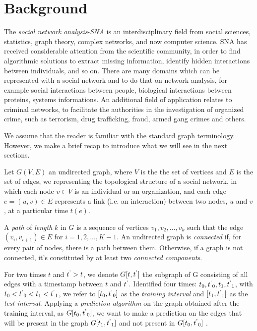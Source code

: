 \section{Background}
\label{sec:background}
The \textit{social network analysis}-\textit{SNA} is an interdisciplinary field from social sciences, statistics, graph theory, complex networks, and now computer science. SNA has received considerable attention from the scientific community, in order to find algorithmic solutions to extract missing information, identify hidden interactions between individuals, and so on. 
There are many domains which can be represented with a social network and to do that on network analysis, for example social interactions between people, biological interactions between proteins, systems informations. An additional field of application relates to criminal networks, to facilitate the authorities in the investigation of organized crime, such as terrorism, drug trafficking, fraud, armed gang crimes and others\cite{xu2005criminal}.


We assume that the reader is familiar with the standard graph terminology. However, we make a brief recap to introduce what we will see in the next sections.

Let $G(V,E)$ an undirected graph, where $V$ is the the set of vertices and $E$ is the set of edges, we representing the topological structure of a social network, in which each node $v \in V$ is an individual or an organization, and each edge $e=(u,v)\in E$ represents a link (i.e. an interaction) between two nodes, $u$ and $v$, at a particular time $t(e)$. 

A \textit{path} of \textit{length} $k$ in $G$ is a sequence of vertices $v_{1},v_{2},...,v_{k}$ such that the edge $(v_{i},v_{i+1}) \in E$ for $i = 1, 2,..., K-1$. An undirected graph is \textit{connected} if, for every pair of nodes, there is a path between them. Otherwise, if a graph is not connected, it's constituted by at least two \textit{connected components}.


For two times $t$ and $t\textsuperscript{'} > t$, we denote $G[t,t\textsuperscript{'}]$ the subgraph of G consisting of all edges with a timestamp between $t$ and $t\textsuperscript{'}$. Identified four times: $t_{0}, t\textsuperscript{'}_{0}, t_{1}, t\textsuperscript{'}_{1}$, with $t_{0}<t\textsuperscript{'}_{0}<t_{1}<t\textsuperscript{'}_{1}$, we refer to $[t_{0},t\textsuperscript{'}_{0}]$ as the \textit{training interval} and $[t_{1},t\textsuperscript{'}_{1}]$ as the \textit{test interval}. Applying a \textit{prediction algorithm} on the graph obtained after the training interval, as $G[t_{0},t\textsuperscript{'}_{0}]$, we want to make a prediction on the edges that will be present in the graph $G[t_{1},t\textsuperscript{'}_{1}]$ and not present in $G[t_{0},t\textsuperscript{'}_{0}]$ \cite{Liben-Nowell}.

